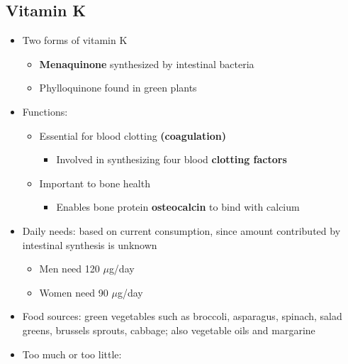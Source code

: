 \documentclass[12pt]{article}
\begin{document}
        \subsection{Vitamin K}
            \begin{itemize}
                \item Two forms of vitamin K
                    \begin{itemize}
                        \item \textbf{Menaquinone} synthesized by intestinal bacteria
                        \item Phylloquinone found in green plants
                    \end{itemize}
                \item Functions:
                    \begin{itemize}
                        \item Essential for blood clotting \textbf{(coagulation)}
                            \begin{itemize}
                                \item Involved in synthesizing four blood \textbf{clotting factors}
                            \end{itemize}
                        \item Important to bone health
                            \begin{itemize}
                                \item Enables bone protein \textbf{osteocalcin} to bind with calcium
                            \end{itemize}
                    \end{itemize}
                \item Daily needs: based on current consumption, since amount contributed by intestinal synthesis is unknown
                    \begin{itemize}
                        \item Men need 120 $\mu$g/day
                        \item Women need 90 $\mu$g/day
                    \end{itemize}
                \item Food sources: green vegetables such as broccoli, asparagus, spinach, salad greens, brussels sprouts, cabbage; also vegetable oils and margarine
                \item Too much or too little:
                    \begin{itemize}

\end{itemize}
\end{itemize}
\end{document}
